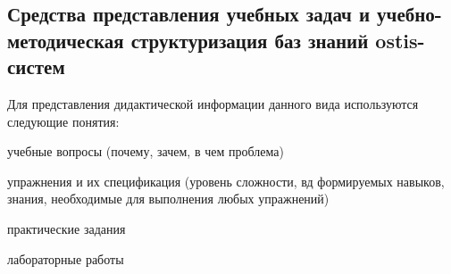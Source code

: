 \begin{SCn}
\end{SCn}

\begin{SCn}
\end{SCn}

\begin{SCn}
\end{SCn}

\begin{SCn}
\end{SCn}

\begin{SCn}
\end{SCn}

\begin{SCn}
\end{SCn}

\begin{SCn}
\end{SCn}

\newpage
\subsection{Средства представления учебных задач и учебно-методическая структуризация баз знаний ostis-систем}
\label{subsec_means_presentation_educational_tasks_educational_methodical_structuring_kb}
Для представления дидактической информации данного вида используются следующие понятия:

\begin{SCn}
	\begin{scnitemize}
		\item учебные вопросы (почему, зачем, в чем проблема)
		\item упражнения и их спецификация (уровень сложности, вд формируемых навыков, знания, необходимые для выполнения любых упражнений)
		\begin{scnitemize}
			\item практические задания
			\item лабораторные работы
		\end{scnitemize}
	\end{scnitemize}
\end{SCn}

